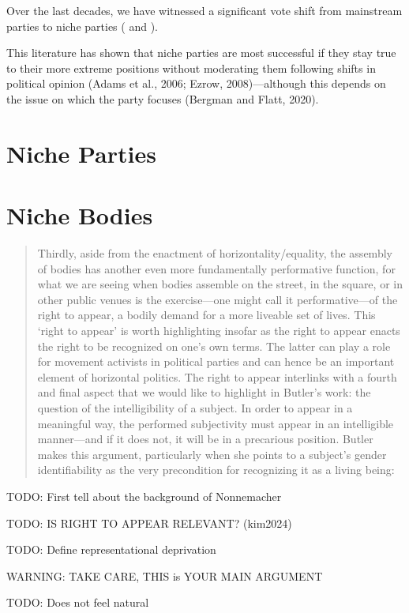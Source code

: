 Over the last decades, we have witnessed a significant vote shift from mainstream parties to niche parties (\cite[see 1]{stiers2024} and \cite{spoon2019}).

This literature has shown that niche parties are most successful if they stay true to their more extreme positions without moderating them following shifts in political opinion (Adams et al., 2006; Ezrow, 2008)—although this depends on the issue on which the party focuses (Bergman and Flatt, 2020).
\cite[2]{stiers2024}

\section{Niche Parties}\label{sec:Niche Parties} %

\section{Niche Bodies}\label{sec:Niche Bodies} %

\begin{quote}
	Thirdly, aside from the enactment of horizontality/equality, the assembly of bodies has another even more fundamentally performative function, for what we are seeing when bodies assemble on the street, in the square, or in other public venues is the exercise—one might call it performative—of the right to appear, a bodily demand for a more liveable set of lives. This ‘right to appear’ is worth highlighting insofar as the right to appear enacts the right to be recognized on one’s own terms. The latter can play a role for movement activists in political parties and can hence be an important element of horizontal politics. The right to appear interlinks with a fourth and final aspect that we would like to highlight in Butler’s work: the question of the intelligibility of a subject. In order to appear in a meaningful way, the performed subjectivity must appear in an intelligible manner—and if it does not, it will be in a precarious position. Butler makes this argument, particularly when she points to a subject’s gender identifiability as the very precondition for recognizing it as a living being:
\end{quote}
\cite[7]{kim2024}

\begin{commentenv}
	TODO: First tell about the background of Nonnemacher

	TODO: IS RIGHT TO APPEAR RELEVANT? (kim2024)

	TODO: Define representational deprivation

	WARNING: TAKE CARE, THIS is YOUR MAIN ARGUMENT

	TODO: Does not feel natural
\end{commentenv}


